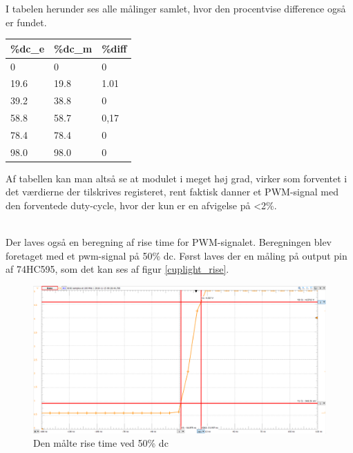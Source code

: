 \documentclass[Modultest/Modultest_main.tex]{subfiles}
\begin{document}
I tabelen herunder ses alle målinger samlet, hvor den procentvise difference også er fundet.

\begin{table}[H]
\begin{tabular}{|l|l|l|}
\hline
\textbf{\%dc\_e} & \textbf{\%dc\_m} & \textbf{\%diff} \\ \hline
0                & 0                & 0               \\ \hline
19.6             & 19.8             & 1.01            \\ \hline
39.2             & 38.8             & 0               \\ \hline
58.8             & 58.7             & 0,17            \\ \hline
78.4             & 78.4             & 0               \\ \hline
98.0             & 98.0             & 0               \\ \hline
\end{tabular}%
\end{table}

Af tabellen kan man altså se at modulet i meget høj grad, virker som forventet i det værdierne der tilskrives registeret, rent faktisk danner et PWM-signal med den forventede duty-cycle, hvor der kun er en afvigelse på <2\%. 

\\Der laves også en beregning af rise time for PWM-signalet.  Beregningen blev foretaget med et pwm-signal på 50\% dc.  Først laves der en måling på output pin af 74HC595, som det kan ses af figur \ref{cuplight_rise}.

\begin{figure}[H]
    \centering
    \includegraphics[width=\textwidth]{Modultest/CupLight/graphics/CupLight_rise_time.png}
    \caption{Den målte rise time ved 50\% dc}
    \label{fig:cuplight_rise}
\end{figure}
\end{document}
